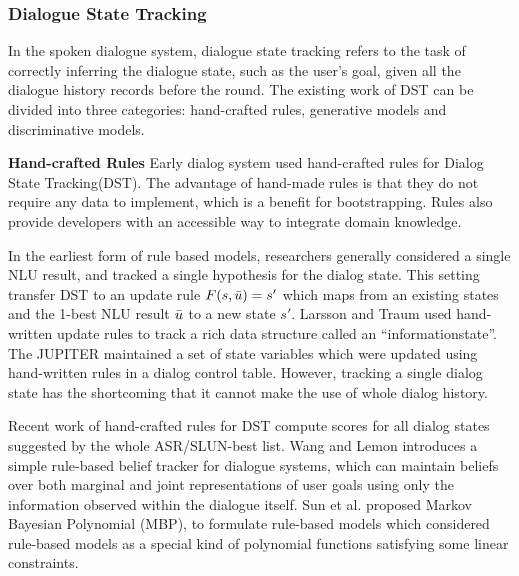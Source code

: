 \documentclass[10pt,twocolumn,letterpaper]{article}
\begin{document}
\subsubsection{Dialogue State Tracking}
In the spoken dialogue system, dialogue state tracking refers to the task of correctly inferring the dialogue state, such as the user's goal, given all the dialogue history records before the round. The existing work of DST can be divided into three categories: hand-crafted rules, generative models and discriminative models.

\textbf{Hand-crafted Rules} 
Early dialog system used hand-crafted rules for Dialog State Tracking(DST). The advantage of hand-made rules is that they do not require any data to implement, which is a benefit for bootstrapping. Rules also provide developers with an accessible way to integrate domain knowledge.

In the earliest form of rule based models, researchers generally considered a single NLU result, and tracked a single hypothesis for the dialog state. This setting transfer DST to an update rule $F(s,\Bar{u}) = s'$ which maps from an existing states and the 1-best NLU result $\Bar{u}$ to a new state $s'$. Larsson and Traum \cite{larsson2000information} used hand-written update rules to track a rich data structure called an “informationstate”. The JUPITER\cite{zue2000juplter} maintained a set of state variables which were updated using hand-written rules in a dialog control table. However, tracking a single dialog state has the shortcoming that it cannot make the use of whole dialog history. 

Recent work of hand-crafted rules for DST compute scores for all dialog states suggested by the whole ASR/SLUN-best list. Wang and Lemon \cite{wang2013simple}  introduces a simple rule-based belief tracker for dialogue systems, which can maintain beliefs over both marginal and joint representations of user goals using only the information observed within the dialogue itself. Sun et al. \cite{sun2014generalized} proposed Markov Bayesian Polynomial (MBP), to formulate rule-based models which considered rule-based models as a special kind of polynomial functions satisfying some linear constraints.
\end{document}
